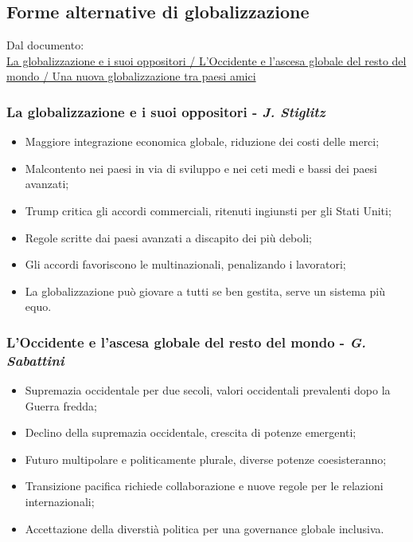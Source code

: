 \documentclass{article}
\begin{document}
\subsection{Forme alternative di globalizzazione}
Dal documento:\\ \href{https://github.com/matteofrongillo/passerella/blob/main/Geografia/media/080_Materiale OLE_Pass 06h ProspettiveFuture 23-24_Pass_06h_ProspettiveFuture_23-24.pdf?raw=true}
{La globalizzazione e i suoi oppositori / L'Occidente e l'ascesa globale del resto del mondo /
Una nuova globalizzazione tra paesi amici}

\subsubsection{La globalizzazione e i suoi oppositori - \textit{J. Stiglitz}}
\begin{itemize}
    \item Maggiore integrazione economica globale, riduzione dei costi delle merci;
    \item Malcontento nei paesi in via di sviluppo e nei ceti medi e bassi dei paesi avanzati;
    \item Trump critica gli accordi commerciali, ritenuti ingiunsti per gli Stati Uniti;
    \item Regole scritte dai paesi avanzati a discapito dei più deboli;
    \item Gli accordi favoriscono le multinazionali, penalizando i lavoratori;
    \item La globalizzazione può giovare a tutti se ben gestita, serve un sistema più equo.
\end{itemize}

\subsubsection{L'Occidente e l'ascesa globale del resto del mondo - \textit{G. Sabattini}}
\begin{itemize}
    \item Supremazia occidentale per due secoli, valori occidentali prevalenti dopo la Guerra
        fredda;
    \item Declino della supremazia occidentale, crescita di potenze emergenti;
    \item Futuro multipolare e politicamente plurale, diverse potenze coesisteranno;
    \item Transizione pacifica richiede collaborazione e nuove regole per le relazioni
        internazionali;
    \item Accettazione della diverstià politica per una governance globale inclusiva.
\end{itemize}
\end{document}
